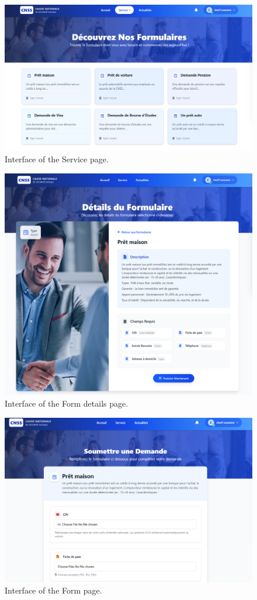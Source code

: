 \begin{figure}[h!]
    \centering
    \includegraphics[width=1\textwidth]{figures/ui-servicepage.png}
    \caption{Interface of the Service page.}
\end{figure}
\begin{figure}[h!]
    \centering
    \includegraphics[width=1\textwidth]{figures/ui-detform.png}
    \caption{Interface of the Form details page.}
\end{figure}
\begin{figure}[h!]
    \centering
    \includegraphics[width=1\textwidth]{figures/ui-form.png}
    \caption{Interface of the Form page.}
\end{figure}
